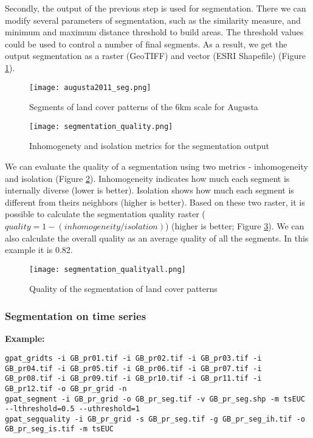 Secondly, the output of the previous step is used for segmentation. 
There we can modify several parameters of segmentation, such as the similarity measure, and minimum and maximum distance threshold to build areas.
The threshold values could be used to control a number of final segments.
As a result, we get the output segmentation as a raster (GeoTIFF) and vector (ESRI Shapefile) (Figure \ref{FIG:SEG1}).

\begin{figure}[H]
	\centering
	\texttt{[image: augusta2011\_seg.png]}
	\caption{Segments of land cover patterns of the 6km scale for Augusta}
	\label{FIG:SEG1}
\end{figure}

\begin{figure}[H]
	\centering
	\texttt{[image: segmentation\_quality.png]}
	\caption{Inhomogenety and isolation metrics for the segmentation output}
	\label{FIG:SEG2}
\end{figure}

We can evaluate the quality of a segmentation using two metrics - inhomogeneity and isolation (Figure \ref{FIG:SEG2}).
Inhomogeneity indicates how much each segment is internally diverse (lower is better).
Isolation shows how much each segment is different from theirs neighbors (higher is better). 
Based on these two raster, it is possible to calculate the segmentation quality raster ($quality = 1 - (inhomogeneity/isolation)$) (higher is better; Figure \ref{FIG:SEG3}).
We can also calculate the overall quality as an average quality of all the segments.
In this example it is 0.82.

\begin{figure}[H]
	\centering
	\texttt{[image: segmentation\_qualityall.png]}
	\caption{Quality of the segmentation of land cover patterns}
	\label{FIG:SEG3}
\end{figure}

\FloatBarrier

\subsubsection{Segmentation on time series}

{\bf Example:}

\begin{minipage}{\linewidth}
\begin{lstlisting}
gpat_gridts -i GB_pr01.tif -i GB_pr02.tif -i GB_pr03.tif -i GB_pr04.tif -i GB_pr05.tif -i GB_pr06.tif -i GB_pr07.tif -i GB_pr08.tif -i GB_pr09.tif -i GB_pr10.tif -i GB_pr11.tif -i GB_pr12.tif -o GB_pr_grid -n
gpat_segment -i GB_pr_grid -o GB_pr_seg.tif -v GB_pr_seg.shp -m tsEUC --lthreshold=0.5 --uthreshold=1
gpat_segquality -i GB_pr_grid -s GB_pr_seg.tif -g GB_pr_seg_ih.tif -o GB_pr_seg_is.tif -m tsEUC
\end{lstlisting}
\end{minipage}

